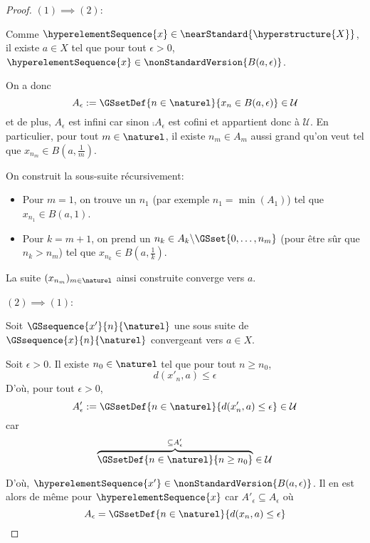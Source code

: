 \ifdefined\outputproof
\begin{proof}
	$(1) \implies (2)$:

	Comme $\hyperelementSequence{x} \in \nearStandard{\hyperstructure{X}}$, il
	existe $a \in X$ tel que pour tout $\epsilon > 0$, $\hyperelementSequence{x}
	\in \nonStandardVersion{B(a, \epsilon)}$.

	On a donc
	\begin{equation}
		A_{\epsilon} := \GSsetDef{n \in \naturel}{x_{n} \in B(a, \epsilon)} \in
		\mathcal{U}
	\end{equation}
	et de plus, $A_{\epsilon}$ est infini car sinon $\comp{A_{\epsilon}}$
	est cofini et appartient donc à $\mathcal{U}$.
	En particulier, pour tout $m \in \naturel$, il existe $n_{m} \in A_{m}$ aussi grand
	qu'on veut tel que $x_{n_{m}} \in B(a, \frac{1}{m})$.

	On construit la sous-suite récursivement:
	\begin{itemize}
		\item Pour $m = 1$, on trouve un $n_{1}$ (par exemple $n_{1} =
			\min(A_{1})$) tel que $x_{n_{1}} \in B(a, 1)$.
		\item Pour $k = m + 1$, on prend un $n_{k} \in A_{k} \backslash \GSset{0, \dots,
				n_{m}}$ (pour être sûr que $n_{k} > n_{m}$) tel que $x_{n_{k}}
				\in B(a, \frac{1}{k})$.
	\end{itemize}

	La suite $(x_{n_{m}})_{m \in \naturel}$ ainsi construite converge vers $a$.

	$(2) \implies (1)$:

	Soit $\GSsequence{x'}{n}{\naturel}$ une sous suite de
$\GSsequence{x}{n}{\naturel}$ convergeant vers $a \in X$.

	Soit $\epsilon > 0$. Il existe $n_{0} \in \naturel$ tel que pour tout $n
	\geq  n_{0}$,
	\begin{equation}
	  d(x'_{n}, a) \leq \epsilon
	\end{equation}
	D'où, pour tout $\epsilon > 0$,
	\begin{equation}
	  A'_{\epsilon} := \GSsetDef{n \in \naturel}{d(x'_{n}, a) \leq \epsilon} \in
\mathcal{U}
	\end{equation}
	car
	\begin{equation}
		\overbrace{\GSsetDef{n \in \naturel}{n \geq n_{0}}}^{\subseteq
			A'_{\epsilon}}
	  \in \mathcal{U}
	\end{equation}

	D'où, $\hyperelementSequence{x'} \in \nonStandardVersion{B(a, \epsilon)}$.
	Il en est alors de même pour $\hyperelementSequence{x}$ car $A'_{\epsilon}
	\subseteq A_{\epsilon}$ où
	\begin{equation}
		A_{\epsilon} = \GSsetDef{n \in \naturel}{d(x_{n}, a) \leq \epsilon}
	\end{equation}
\end{proof}
\fi

